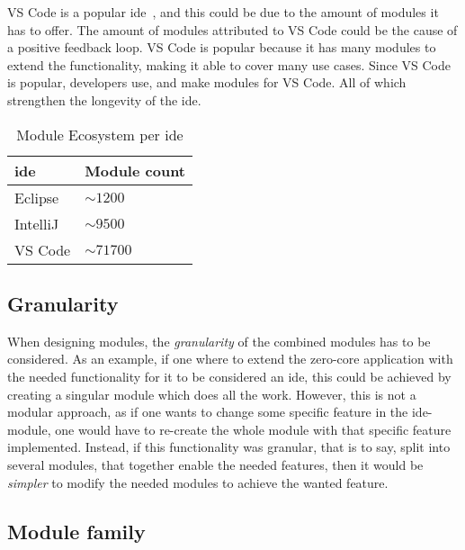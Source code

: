 
VS Code is a popular \gls*{ide}~\cite{topIde}, and this could be due to
the amount of modules it has to offer. The amount of modules attributed to
VS Code could be the cause of a positive feedback loop. VS Code is
popular because it has many modules to extend the functionality, making it able
to cover many use cases. Since VS Code is popular, developers use, and make
modules for VS Code. All of which strengthen the longevity of the
\gls*{ide}.

\begin{table}[]
  \centering
  \caption{Module Ecosystem per \gls*{ide}}
  \label{tbl:mod}
  \begin{tabular}{|l|l|}
    \hline
    \gls*{ide} & Module count \\ \hline
    Eclipse & $\sim1200$ \\ \hline
    IntelliJ & $\sim9500$ \\ \hline
    VS Code & $\sim71700$ \\ \hline
  \end{tabular}
\end{table}


\subsection{Granularity}

When designing modules, the \textit{granularity} of the combined modules has to
be considered. As an example, if one where to extend the zero-core application
with the needed functionality for it to be considered an \gls*{ide}, this could be
achieved by creating a singular module which does all the work. However, this
is not a modular approach, as if one wants to change some specific feature in
the \gls*{ide}-module, one would have to re-create the whole module with that
specific feature implemented. Instead, if this functionality was granular,
that is to say, split into several modules, that together enable the needed
features, then it would be \textit{simpler} to modify the needed modules to
achieve the wanted feature.


\subsection{Module family}

